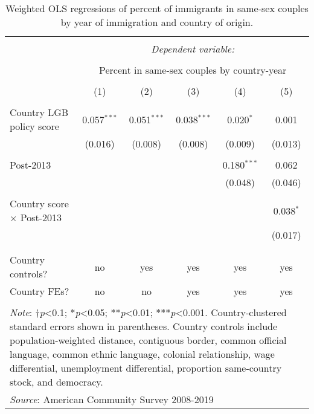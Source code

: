\documentclass[
  11pt,
]{article}
\begin{document}
\begin{table}[H] \centering 
  \caption{Weighted OLS regressions of percent of immigrants in same-sex couples by year of immigration and country of origin.} 
  \label{tab:country-props} 
\begin{tabular}{@{\extracolsep{5pt}}lccccc} 
\\[-1.8ex]\hline 
\hline \\[-1.8ex] 
 & \multicolumn{5}{c}{\textit{Dependent variable:}} \\ 
\cline{2-6} 
\\[-1.8ex] & \multicolumn{5}{c}{Percent in same-sex couples by country-year} \\ 
\\[-1.8ex] & (1) & (2) & (3) & (4) & (5)\\ 
\hline \\[-1.8ex] 
 Country LGB policy score & 0.057$^{***}$ & 0.051$^{***}$ & 0.038$^{***}$ & 0.020$^{*}$ & 0.001 \\ 
  & (0.016) & (0.008) & (0.008) & (0.009) & (0.013) \\ 
  & & & & & \\ 
 Post-2013 &  &  &  & 0.180$^{***}$ & 0.062 \\ 
  &  &  &  & (0.048) & (0.046) \\ 
  & & & & & \\ 
 Country score × Post-2013 &  &  &  &  & 0.038$^{*}$ \\ 
  &  &  &  &  & (0.017) \\ 
  & & & & & \\ 
\hline \\[-1.8ex] 
Country controls? & no & yes & yes & yes & yes \\ 
Country FEs? & no & no & yes & yes & yes \\ 
\hline 
\hline \\[-1.8ex] 
\multicolumn{6}{l}{\parbox[t]{.8\textwidth}{\textit{Note}: †\textit{p}<0.1; *\textit{p}<0.05; **\textit{p}<0.01; ***\textit{p}<0.001. Country-clustered standard errors shown in parentheses. Country controls include population-weighted distance, contiguous border, common official language, common ethnic language, colonial relationship, wage differential, unemployment differential, proportion same-country stock, and democracy.}} \\ 
\multicolumn{6}{l}{\textit{Source}: American Community Survey 2008-2019} \\ 
\end{tabular} 
\end{table}
\end{document}
